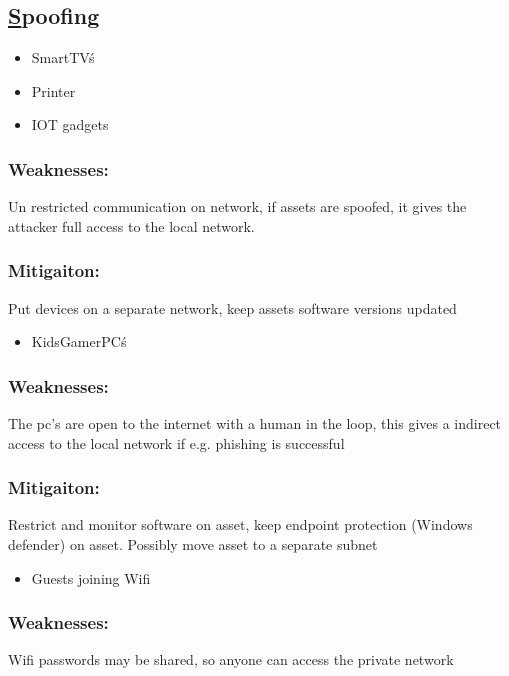 \documentclass[
	letterpaper, %
	10pt, %
	unnumberedsections, %
	twoside, %
]{APAAssignment}
\begin{document}
\subsection{\underline{S}poofing}
\begin{singlespace}

\begin{itemize}
	\item SmartTV\'s
	\item Printer 
	\item IOT gadgets 
\end{itemize}

\subsubsection{Weaknesses:} Un restricted communication on network, if assets are spoofed, it gives the attacker full access to the local network.
\subsubsection{Mitigaiton:} Put devices on a separate network, keep assets software versions updated

\begin{itemize}
	\item KidsGamerPC\'s
\end{itemize}

\subsubsection{Weaknesses:} The pc's are open to the internet with a human in the loop, this gives a indirect access to the local network if e.g. phishing is successful
\subsubsection{Mitigaiton:} Restrict and monitor software on asset, keep endpoint protection (Windows defender) on asset. Possibly move asset to a separate subnet

\begin{itemize}
	\item Guests joining Wifi
\end{itemize}

\subsubsection{Weaknesses:} Wifi passwords may be shared, so anyone can access the private network

\end{singlespace}
\end{document}
